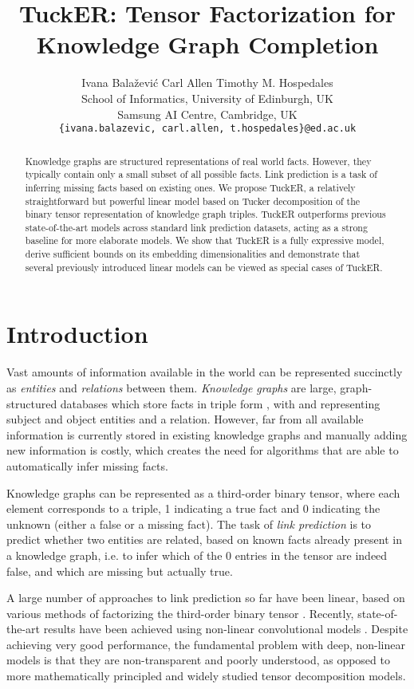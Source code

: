 \documentclass[11pt,a4paper]{article}
\title{TuckER: Tensor Factorization for Knowledge Graph Completion}
\author{\quad Ivana Bala\v{z}evi\'c \hspace{1.2cm} Carl Allen \hspace{.7cm} Timothy M. Hospedales\\
   School of Informatics, University of Edinburgh, UK\\
   Samsung AI Centre, Cambridge, UK\\
  {\tt \{ivana.balazevic, carl.allen, t.hospedales\}@ed.ac.uk} 
  }
\date{}
\begin{document}
\maketitle
\begin{abstract}
  Knowledge graphs are structured representations of real world facts. However, they typically contain only a small subset of all possible facts. Link prediction is a task of inferring missing facts based on existing ones. We propose TuckER, a relatively straightforward but powerful linear model based on Tucker decomposition of the binary tensor representation of knowledge graph triples. TuckER outperforms previous state-of-the-art models across standard link prediction datasets, acting as a strong baseline for more elaborate models. We show that TuckER is a fully expressive model, derive sufficient bounds on its embedding dimensionalities and demonstrate that several previously introduced linear models can be viewed as special cases of TuckER.
\end{abstract}

\section{Introduction}
\label{introduction}

Vast amounts of information available in the world can be represented succinctly as \emph{entities} and \emph{relations} between them. \emph{Knowledge graphs} are large, graph-structured databases which store facts in triple form , with  and  representing subject and object entities and  a relation. However, far from all available information is currently stored in existing knowledge graphs and manually adding new information is costly, which creates the need for algorithms that are able to automatically infer missing facts. 

Knowledge graphs can be represented as a third-order binary tensor, where each element corresponds to a triple, 1 indicating a true fact and 0 indicating the unknown (either a false or a missing fact). The task of \emph{link prediction} is to predict whether two entities are related, based on known facts already present in a knowledge graph, i.e. to infer which of the 0 entries in the tensor are indeed false, and which are missing but actually true.

A large number of approaches to link prediction so far have been linear, based on various methods of factorizing the third-order binary tensor \cite{nickel2011three, yang2014embedding, trouillon2016complex, kazemi2018simple}. Recently, state-of-the-art results have been achieved using non-linear convolutional models \cite{dettmers2018convolutional, balazevic2019hypernetwork}. Despite achieving very good performance, the fundamental problem with deep, non-linear models is that they are non-transparent and poorly understood, as opposed to more mathematically principled and widely studied tensor decomposition models.
\end{document}
